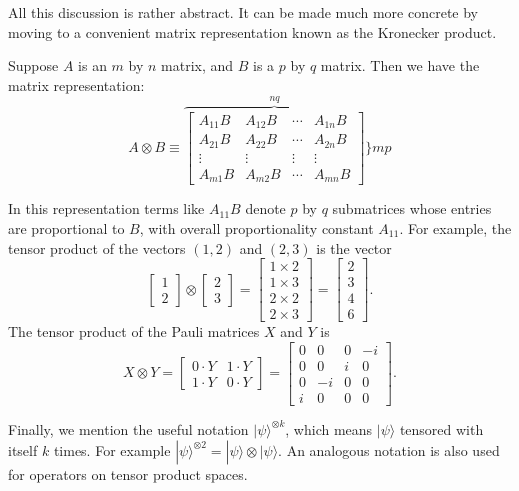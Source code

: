 All this discussion is rather abstract. It can be made much more concrete by moving to a convenient matrix representation known as the Kronecker product. 

Suppose $A$ is an $m$ by $n$ matrix, and $B$ is a $p$ by $q$ matrix. Then we have the matrix representation:
$$
A \otimes B \equiv \overbrace{\left[\begin{array}{cccc}
A_{11} B & A_{12} B & \cdots & A_{1 n} B \\
A_{21} B & A_{22} B & \cdots & A_{2 n} B \\
\vdots & \vdots & \vdots & \vdots \\
A_{m 1} B & A_{m 2} B & \cdots & A_{m n} B
\end{array}\right]}^{n q}\} m p
$$

In this representation terms like $A_{11} B$ denote $p$ by $q$ submatrices whose entries are proportional to $B$, with overall proportionality constant $A_{11}$. For example, the tensor product of the vectors $(1,2)$ and $(2,3)$ is the vector
$$
\left[\begin{array}{l}
1 \\
2
\end{array}\right] \otimes\left[\begin{array}{l}
2 \\
3
\end{array}\right]=\left[\begin{array}{l}
1 \times 2 \\
1 \times 3 \\
2 \times 2 \\
2 \times 3
\end{array}\right]=\left[\begin{array}{l}
2 \\
3 \\
4 \\
6
\end{array}\right].
$$
The tensor product of the Pauli matrices $X$ and $Y$ is
$$
X \otimes Y=\left[\begin{array}{cc}
0 \cdot Y & 1 \cdot Y \\
1 \cdot Y & 0 \cdot Y
\end{array}\right]=\left[\begin{array}{cccc}
0 & 0 & 0 & -i \\
0 & 0 & i & 0 \\
0 & -i & 0 & 0 \\
i & 0 & 0 & 0
\end{array}\right].
$$

Finally, we mention the useful notation $|\psi\rangle^{\otimes k}$, which means $|\psi\rangle$ tensored with itself $k$ times. For example $|\psi\rangle^{\otimes 2}=|\psi\rangle \otimes|\psi\rangle$. An analogous notation is also used for operators on tensor product spaces.

